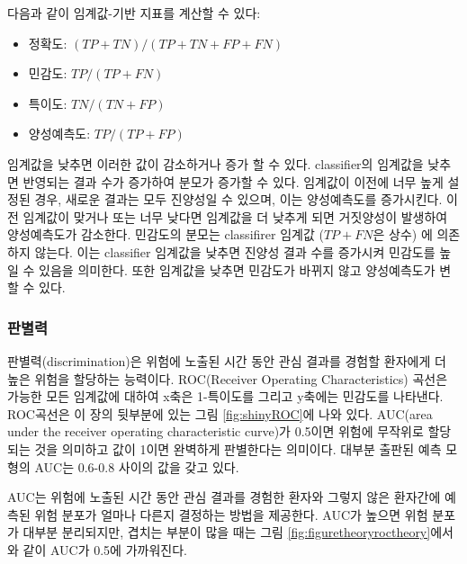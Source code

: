 \documentclass[11pt]{book}
\providecommand{\tightlist}{%
  \setlength{\itemsep}{0pt}\setlength{\parskip}{0pt}}
\theoremstyle{definition}
\theoremstyle{definition}
\theoremstyle{definition}
\theoremstyle{remark}
\begin{document}
다음과 같이 임계값-기반 지표를 계산할 수 있다:

\begin{itemize}
\tightlist
\item
  정확도: \((TP+TN)/(TP+TN+FP+FN)\)
\item
  민감도: \(TP/(TP+FN)\)
\item
  특이도: \(TN/(TN+FP)\)
\item
  양성예측도: \(TP/(TP+FP)\)
\end{itemize}

임계값을 낮추면 이러한 값이 감소하거나 증가 할 수 있다. classifier의
임계값을 낮추면 반영되는 결과 수가 증가하여 분모가 증가할 수 있다.
임계값이 이전에 너무 높게 설정된 경우, 새로운 결과는 모두 진양성일 수
있으며, 이는 양성예측도를 증가시킨다. 이전 임계값이 맞거나 또는 너무
낮다면 임계값을 더 낮추게 되면 거짓양성이 발생하여 양성예측도가
감소한다. 민감도의 분모는 classifirer 임계값 (\(TP+FN\)은 상수) 에
의존하지 않는다. 이는 classifier 임계값을 낮추면 진양성 결과 수를
증가시켜 민감도를 높일 수 있음을 의미한다. 또한 임계값을 낮추면 민감도가
바뀌지 않고 양성예측도가 변할 수 있다.

\subsubsection*{판별력}

판별력(discrimination)은 위험에 노출된 시간 동안 관심 결과를 경험할
환자에게 더 높은 위험을 할당하는 능력이다. ROC(Receiver Operating
Characteristics) 곡선은 가능한 모든 임계값에 대하여 x축은 1-특이도를
그리고 y축에는 민감도를 나타낸다. ROC곡선은 이 장의 뒷부분에 있는 그림
\ref{fig:shinyROC}에 나와 있다. AUC(area under the receiver operating
characteristic curve)가 0.5이면 위험에 무작위로 할당되는 것을 의미하고
값이 1이면 완벽하게 판별한다는 의미이다. 대부분 출판된 예측 모형의 AUC는
0.6-0.8 사이의 값을 갖고 있다.  

AUC는 위험에 노출된 시간 동안 관심 결과를 경험한 환자와 그렇지 않은
환자간에 예측된 위험 분포가 얼마나 다른지 결정하는 방법을 제공한다.
AUC가 높으면 위험 분포가 대부분 분리되지만, 겹치는 부분이 많을 때는 그림
\ref{fig:figuretheoryroctheory}에서와 같이 AUC가 0.5에 가까워진다.
\end{document}
